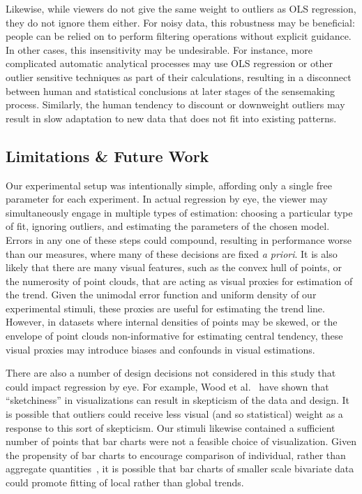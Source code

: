 \documentclass{sigchi}
\begin{document}
Likewise, while viewers do not give the same weight to outliers as OLS regression, they do not ignore them either. For noisy data, this robustness may be beneficial: people can be relied on to perform filtering operations without explicit guidance. In other cases, this insensitivity may be undesirable. For instance, more complicated automatic analytical processes may use OLS regression or other outlier sensitive techniques as part of their calculations, resulting in a disconnect between human and statistical conclusions at later stages of the sensemaking process. Similarly, the human tendency to discount or downweight outliers may result in slow adaptation to new data that does not fit into existing patterns.

\subsection{Limitations \& Future Work}

Our experimental setup was intentionally simple, affording only a single free parameter for each experiment. In actual regression by eye, the viewer may simultaneously engage in multiple types of estimation: choosing a particular type of fit, ignoring outliers, and estimating the parameters of the chosen model. Errors in any one of these steps could compound, resulting in performance worse than our measures, where many of these decisions are fixed \emph{a priori}. It is also likely that there are many visual features, such as the convex hull of points, or the numerosity of point clouds, that are acting as visual proxies for estimation of the trend. Given the unimodal error function and uniform density of our experimental stimuli, these proxies are useful for estimating the trend line. However, in datasets where internal densities of points may be skewed, or the envelope of point clouds non-informative for estimating central tendency, these visual proxies may introduce biases and confounds in visual estimations.

There are also a number of design decisions not considered in this study that could impact regression by eye. For example, Wood et al.~\cite{wood2012sketchy} have shown that ``sketchiness'' in visualizations can result in skepticism of the data and design. It is possible that outliers could receive less visual (and so statistical) weight as a response to this sort of skepticism. Our stimuli likewise contained a sufficient number of points that bar charts were not a feasible choice of visualization. Given the propensity of bar charts to encourage comparison of individual, rather than aggregate quantities~\cite{zacks1999bars}, it is possible that bar charts of smaller scale bivariate data could promote fitting of local rather than global trends.
\end{document}
